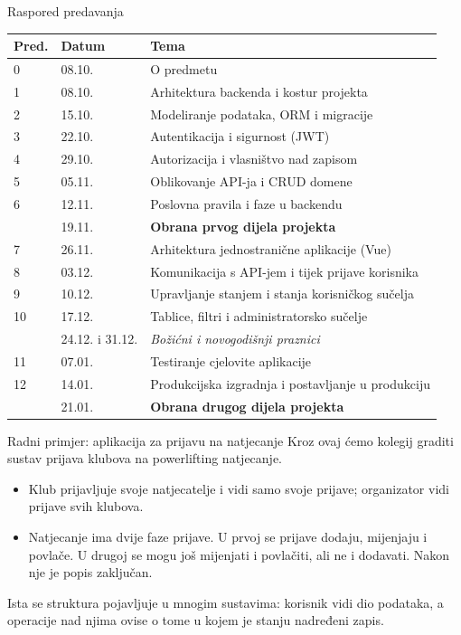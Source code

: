 \begin{frame}{Raspored predavanja}
{\footnotesize
	\renewcommand{\arraystretch}{1.0}
	\begin{tabular}{@{}lll@{}}
		\toprule
		\textbf{Pred.} & \textbf{Datum} & \textbf{Tema} \\
		\midrule
		0  & 08.10. & O predmetu \\
		1  & 08.10. & Arhitektura backenda i kostur projekta \\
		2  & 15.10. & Modeliranje podataka, ORM i migracije \\
		3  & 22.10. & Autentikacija i sigurnost (JWT) \\
		4  & 29.10. & Autorizacija i vlasništvo nad zapisom \\
		5  & 05.11. & Oblikovanje API-ja i CRUD domene \\
		6  & 12.11. & Poslovna pravila i faze u backendu \\
		   & 19.11. & \textbf{Obrana prvog dijela projekta} \\
		7  & 26.11. & Arhitektura jednostranične aplikacije (Vue) \\
		8  & 03.12. & Komunikacija s API-jem i tijek prijave korisnika \\
		9  & 10.12. & Upravljanje stanjem i stanja korisničkog sučelja \\
		10 & 17.12. & Tablice, filtri i administratorsko sučelje \\
		   & 24.12. i 31.12. & \emph{Božićni i novogodišnji praznici} \\
		11 & 07.01. & Testiranje cjelovite aplikacije \\
		12 & 14.01. & Produkcijska izgradnja i postavljanje u produkciju \\
		   & 21.01. & \textbf{Obrana drugog dijela projekta} \\
		\bottomrule
	\end{tabular}
}
\end{frame}

\begin{frame}{Radni primjer: aplikacija za prijavu na natjecanje}
Kroz ovaj ćemo kolegij graditi sustav prijava klubova na powerlifting natjecanje.

\begin{itemize}
  \item Klub prijavljuje svoje natjecatelje i vidi samo svoje prijave; organizator vidi prijave svih klubova.
  \item Natjecanje ima dvije faze prijave. U prvoj se prijave dodaju, mijenjaju i povlače. U drugoj se mogu još mijenjati i povlačiti, ali ne i dodavati. Nakon nje je popis zaključan.
\end{itemize}

\vspace{0.4em}
Ista se struktura pojavljuje u mnogim sustavima: korisnik vidi dio podataka, a operacije nad njima ovise o tome u kojem je stanju nadređeni zapis.
\end{frame}

